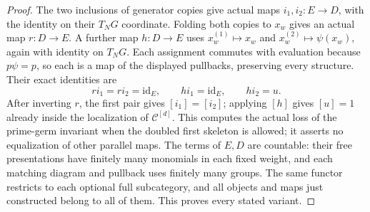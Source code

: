 \begin{proof}
The two inclusions of generator copies give actual maps
$i_1,i_2:E\to D$, with the identity on their $T_NG$
coordinate. Folding both copies to $x_w$ gives an actual
map $r:D\to E$. A further map $h:D\to E$ uses
$x_w^{(1)}\mapsto x_w$ and
$x_w^{(2)}\mapsto\psi(x_w)$, again with identity
on $T_NG$. Each assignment commutes with evaluation
because $p\psi=p$, so each is a map of the displayed
pullbacks, preserving every structure. Their exact identities are
\[
             r i_1=r i_2=\mathrm{id}_E,\qquad
             h i_1=\mathrm{id}_E,\qquad h i_2=u.
\]
After inverting $r$, the first pair gives $[i_1]=[i_2]$;
applying $[h]$ gives $[u]=1$ already inside the localization
of $\mathcal C^{[d]}$. This computes the actual loss of
the prime-germ invariant when the doubled first skeleton
is allowed; it asserts no equalization of other parallel maps.
The terms of $E,D$ are countable: their free presentations
have finitely many monomials in each fixed weight, and each
matching diagram and pullback uses finitely many groups.
The same functor restricts to each optional full
subcategory, and all objects and maps just constructed
belong to all of them. This proves every stated variant.
\end{proof}
